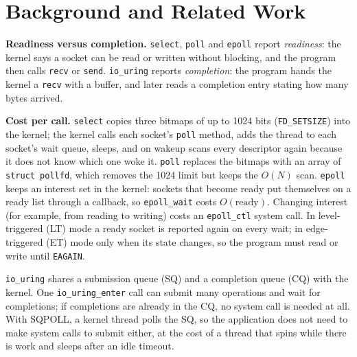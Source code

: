 \documentclass[conference,10pt]{IEEEtran}
\newcommand{\code}[1]{\texttt{#1}}
\begin{document}
\section{Background and Related Work}
\textbf{Readiness versus completion.} \code{select}, \code{poll} and \code{epoll} report \emph{readiness}: the kernel says a socket can be read or written without blocking, and the program then calls \code{recv} or \code{send}. \code{io\_uring} reports \emph{completion}: the program hands the kernel a \code{recv} with a buffer, and later reads a completion entry stating how many bytes arrived.

\textbf{Cost per call.} \code{select} copies three bitmaps of up to 1024 bits (\code{FD\_SETSIZE}) into the kernel; the kernel calls each socket's \code{poll} method, adds the thread to each socket's wait queue, sleeps, and on wakeup scans every descriptor again because it does not know which one woke it. \code{poll} replaces the bitmaps with an array of \code{struct pollfd}, which removes the 1024 limit but keeps the $O(N)$ scan. \code{epoll} keeps an interest set in the kernel: sockets that become ready put themselves on a ready list through a callback, so \code{epoll\_wait} costs $O(\text{ready})$. Changing interest (for example, from reading to writing) costs an \code{epoll\_ctl} system call. In level-triggered (LT) mode a ready socket is reported again on every wait; in edge-triggered (ET) mode only when its state changes, so the program must read or write until \code{EAGAIN}.

\code{io\_uring} shares a submission queue (SQ) and a completion queue (CQ) with the kernel. One \code{io\_uring\_enter} call can submit many operations and wait for completions; if completions are already in the CQ, no system call is needed at all. With SQPOLL, a kernel thread polls the SQ, so the application does not need to make system calls to submit either, at the cost of a thread that spins while there is work and sleeps after an idle timeout.
\end{document}
